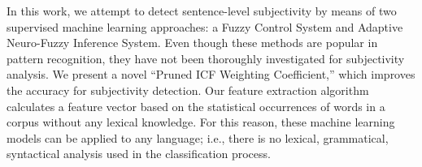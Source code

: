 In this work, we attempt to detect sentence-level subjectivity by means of two supervised machine learning approaches: a Fuzzy Control System and Adaptive
 Neuro-Fuzzy Inference System. Even though these methods are popular in pattern
 recognition, they have not been thoroughly investigated for subjectivity
 analysis. We present a novel ``Pruned ICF Weighting Coefficient,'' which
 improves the accuracy for subjectivity detection. Our feature extraction
 algorithm calculates a feature vector based on the statistical occurrences of
 words in a corpus without any lexical knowledge. For this reason, these machine
 learning models can be applied to any language; i.e., there is no lexical,
 grammatical, syntactical analysis used in the classification process.

